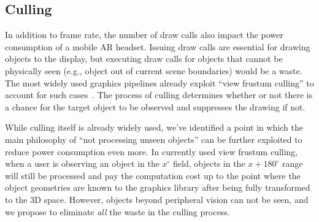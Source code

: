 

\subsection{Culling}

In addition to frame rate, the number of draw calls also impact the power 
consumption of a mobile AR headset.
%
Issuing draw calls are essential for drawing objects to the display, but 
executing draw calls for objects that cannot be physically seen 
(e.g., object out of current scene boundaries) would be a waste.
%
The most widely used graphics pipelines already exploit ``view frustum culling'' 
to account for such cases~\cite{}. The process of culling determines whether or not there 
is a chance for the target object to be observed 
and suppresses the drawing if not.
%
%


While culling itself is already widely used, we've identified a point in which 
the main philosophy of ``not processing unseen objects'' can be further exploited 
to reduce power consumption even more.
%
In currently used view frustum culling, when a user is observing an object in the $x^\circ$ field, objects in the $x+180^\circ$ range 
will still be processed and pay the computation cost up to the point where the object geometries are known to the graphics library after being fully transformed to the 3D space.
%
%
%
However, objects beyond peripheral vision can not be seen, and we propose to 
eliminate \textit{all} the waste in the culling process.


